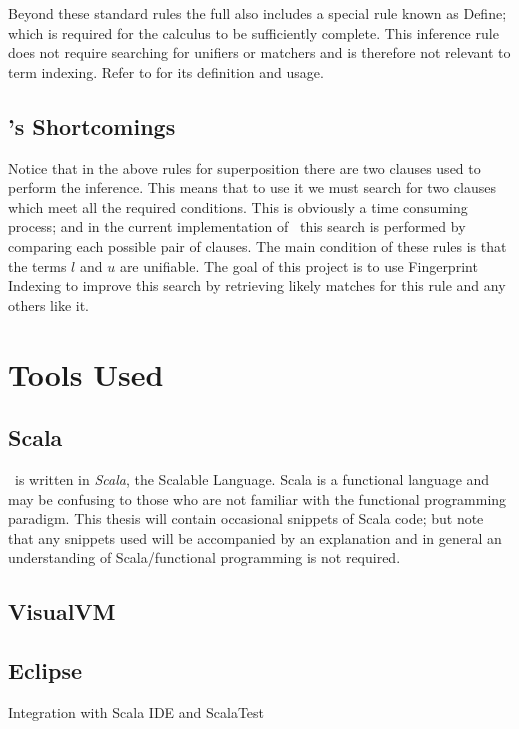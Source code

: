 Beyond these standard rules the full \HSWAC also includes a special
rule known as Define; which is required for the calculus to be sufficiently
complete. This inference rule does not require searching for unifiers or matchers
and is therefore not relevant to term indexing. Refer to \cite{baum13} for its
definition and usage.

\subsection{\Beagle's Shortcomings}
\label{sec:shortcomings}
Notice that in the above rules for superposition there are two clauses used
to perform the inference. This means that to use it we must search for two clauses
which meet all the required conditions. This is obviously a time consuming process;
and in the current implementation of \beagle\ this search is performed by comparing
each possible pair of clauses. The main condition of these rules is that the terms
$l$ and $u$ are unifiable. The goal of this project is to use Fingerprint Indexing to improve
this search by retrieving likely matches for this rule and any others like it.


\section{Tools Used}

\subsection{Scala}
\label{sec:scala}

\Beagle\ is written in \emph{Scala}, the Scalable Language. Scala
is a functional language and may be confusing to those who are not familiar with the
functional programming paradigm. This thesis will contain occasional snippets of
Scala code; but note that any snippets used will be accompanied by an explanation
and in general an understanding of Scala/functional programming is not required.

\cite{scala}

\subsection{VisualVM}
\cite{visualvm}

\subsection{Eclipse}
Integration with Scala IDE and ScalaTest

\cite{eclipse}
\cite{scalaide}
\cite{scalatest}

